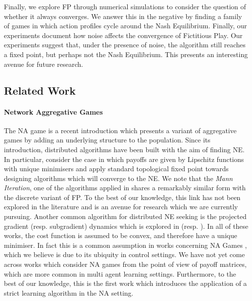 \documentclass{article}
\theoremstyle{definition}
\begin{document}
  Finally, we explore FP through numerical simulations to consider the
  question of whether it always converges. We answer this in the negative by finding a family of
  games in which action profiles cycle around the Nash Equilibrium. Finally, our experiments
  document how noise affects the convergence of Fictitious Play. Our experiments suggest that, under
  the presence of noise, the algorithm still reaches a fixed point, but perhaps not the Nash
  Equilibrium. This presents an interesting avenue for future research.

\subsection{Related Work}

\paragraph{Network Aggregative Games}

The NA game is a recent introduction \cite{Parise2015} which presents a variant of aggregative games
by adding an underlying structure to the population. Since its introduction, distributed algorithms
have been built with the aim of finding NE. In particular, \cite{Parise2015, Parise2020} consider
the case in which payoffs are given by Lipschitz functions with unique minimisers and apply standard
topological fixed point towards designing algorithms which will converge to the NE. We note that the
\emph{Mann Iteration}, one of the algorithms applied in \cite{Parise2020} shares a remarkably
similar form with the discrete variant of FP. To the best of our knowledge, this link has not been
explored in the literature and is an avenue for research which we are currently pursuing. Another
common algorithm for distributed NE seeking is the projected gradient (resp. subgradient) dynamics
which is explored in \cite{Zhang2020} (resp. \cite{Shokri2020, Shokri2021}). In all of these works,
the cost function is assumed to be convex, and therefore have a unique minimiser. In fact this is a
common assumption in works concerning NA Games \cite{Zhu2021, Lei2020}, which we believe is due to
its ubiquity in control settings. We have not yet come across works which consider NA games from the
point of view of payoff matrices, which are more common in multi agent learning settings.
Furthermore, to the best of our knowledge, this is the first work which introduces the application
of a strict learning algorithm in the NA setting.
\end{document}
